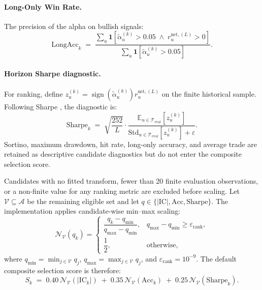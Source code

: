 \paragraph{Long-Only Win Rate.}
The precision of the alpha on bullish signals:
\begin{equation}
    \mathrm{LongAcc}_k \;=\;
    \frac{
        \sum_u \mathbf{1}\!\left[
            \tilde{\alpha}^{(k)}_u > 0.05 \;\wedge\; r^{\mathrm{net},(L)}_u > 0
        \right]
    }{
        \sum_u \mathbf{1}\!\left[
            \tilde{\alpha}^{(k)}_u > 0.05
        \right]
    }.
\end{equation}

\paragraph{Horizon Sharpe diagnostic.}
For ranking, define $z^{(k)}_u=\operatorname{sign}(\tilde{\alpha}^{(k)}_u)
r^{\mathrm{net},(L)}_u$ on the finite historical sample. Following Sharpe
\cite{sharpe1966mutual}, the diagnostic is:
\begin{equation}
    \mathrm{Sharpe}_k \;=\;
    \sqrt{\frac{252}{L}} \cdot
    \frac{
        \mathbb{E}_{u\in\mathcal{T}_{\mathrm{eval}}}\!\left[z^{(k)}_u\right]
    }{
        \mathrm{Std}_{u\in\mathcal{T}_{\mathrm{eval}}}\!\left[z^{(k)}_u\right]
        + \varepsilon
    }.
    \label{eq:sharpe}
\end{equation}
Sortino, maximum drawdown, hit rate, long-only accuracy, and average trade are
retained as descriptive candidate diagnostics but do not enter the composite
selection score.

Candidates with no fitted transform, fewer than 20 finite evaluation
observations, or a non-finite value for any ranking metric are excluded before scaling. Let
$\mathcal{V}\subseteq\mathcal{A}$ be the remaining eligible set and let
$q\in\{|\mathrm{IC}|,\mathrm{Acc},\mathrm{Sharpe}\}$.
The implementation applies candidate-wise min--max scaling:
\begin{equation}
    \mathcal{N}_{\mathcal{V}}(q_k) =
    \begin{cases}
        \dfrac{q_k-q_{\min}}{q_{\max}-q_{\min}},
        & q_{\max}-q_{\min} \geq \varepsilon_{\mathrm{rank}},\\[6pt]
        \dfrac{1}{2}, & \text{otherwise},
    \end{cases}
    \label{eq:candidate_minmax}
\end{equation}
where $q_{\min}=\min_{j\in\mathcal{V}}q_j$,
$q_{\max}=\max_{j\in\mathcal{V}}q_j$, and
$\varepsilon_{\mathrm{rank}}=10^{-9}$. The default composite selection
score is therefore:
\begin{equation}
    S_k \;=\;
    0.40\,\mathcal{N}_{\mathcal{V}}(|\mathrm{IC}_k|)
    \;+\; 0.35\,\mathcal{N}_{\mathcal{V}}(\mathrm{Acc}_k)
    \;+\; 0.25\,\mathcal{N}_{\mathcal{V}}(\mathrm{Sharpe}_k).
    \label{eq:composite}
\end{equation}

